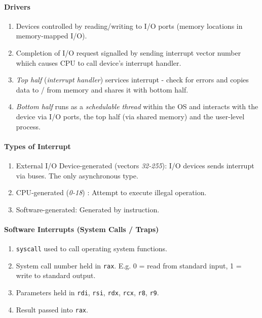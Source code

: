 \documentclass[twocolumn,english]{article}
\begin{document}
\paragraph{Drivers}
\begin{enumerate}
\item Devices controlled by reading/writing to I/O ports (memory locations
in memory-mapped I/O).
\item Completion of I/O request signalled by sending interrupt vector number
whiich causes CPU to call device's interrupt handler.
\item \emph{Top half} (\emph{interrupt handler}) services interrupt - check
for errors and copies data to / from memory and shares it with bottom
half.
\item \emph{Bottom half} runs as a \emph{schedulable thread} within the
OS and interacts with the device via I/O ports, the top half (via
shared memory) and the user-level process.
\end{enumerate}

\paragraph{Types of Interrupt}
\begin{enumerate}
\item External I/O Device-generated (vectors \emph{32-255}): I/O devices
sends interrupt via buses. The only asynchronous type.
\item CPU-generated (\emph{0-18}) : Attempt to execute illegal operation.
\item Software-generated: Generated by instruction.
\end{enumerate}

\paragraph{Software Interrupts (System Calls / Traps)}
\begin{enumerate}
\item \texttt{syscall} used to call operating system functions.
\item System call number held in \texttt{rax}. E.g. 0 = read from standard
input, 1 = write to standard output.
\item Parameters held in \texttt{rdi}, \texttt{rsi}, \texttt{rdx}, \texttt{rcx},
\texttt{r8}, \texttt{r9}.
\item Result passed into \texttt{rax}.\end{enumerate}
\end{document}
